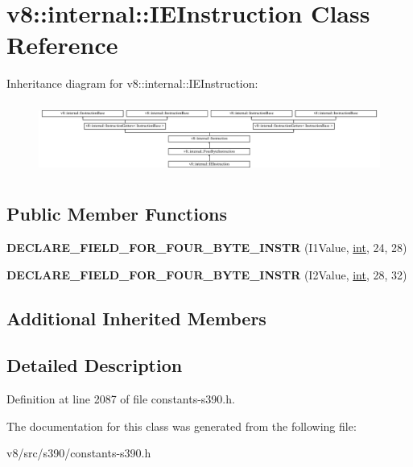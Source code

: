 \hypertarget{classv8_1_1internal_1_1IEInstruction}{}\section{v8\+:\+:internal\+:\+:I\+E\+Instruction Class Reference}
\label{classv8_1_1internal_1_1IEInstruction}
Inheritance diagram for v8\+:\+:internal\+:\+:I\+E\+Instruction\+:\begin{figure}[H]
\begin{center}
\leavevmode
\includegraphics[height=2.364865cm]{classv8_1_1internal_1_1IEInstruction}
\end{center}
\end{figure}
\subsection*{Public Member Functions}
\begin{DoxyCompactItemize}
\item 
\mbox{\label{classv8_1_1internal_1_1IEInstruction_a22e98d6c6b201a4ec7920d1e1134e6d4}} 
{\bfseries D\+E\+C\+L\+A\+R\+E\+\_\+\+F\+I\+E\+L\+D\+\_\+\+F\+O\+R\+\_\+\+F\+O\+U\+R\+\_\+\+B\+Y\+T\+E\+\_\+\+I\+N\+S\+TR} (I1\+Value, \mbox{\hyperlink{classint}{int}}, 24, 28)
\item 
\mbox{\label{classv8_1_1internal_1_1IEInstruction_a53951e3870a6fa9c0e724e7a501aa4da}} 
{\bfseries D\+E\+C\+L\+A\+R\+E\+\_\+\+F\+I\+E\+L\+D\+\_\+\+F\+O\+R\+\_\+\+F\+O\+U\+R\+\_\+\+B\+Y\+T\+E\+\_\+\+I\+N\+S\+TR} (I2\+Value, \mbox{\hyperlink{classint}{int}}, 28, 32)
\end{DoxyCompactItemize}
\subsection*{Additional Inherited Members}


\subsection{Detailed Description}


Definition at line 2087 of file constants-\/s390.\+h.



The documentation for this class was generated from the following file\+:\begin{DoxyCompactItemize}
\item 
v8/src/s390/constants-\/s390.\+h\end{DoxyCompactItemize}
